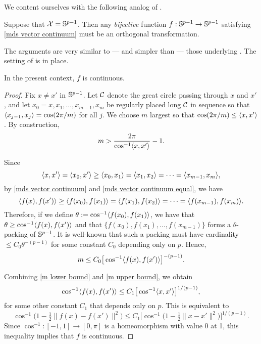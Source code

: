 \documentclass[twoside, 11pt]{article}
\begin{document}
We content ourselves with the following analog of .

\begin{proposition}
\label{prp:shepard_sphere}
Suppose that $\mathcal{X} = \mathbb{S}^{p-1}$. Then any {\em bijective} function $f: \mathbb{S}^{p-1} \to \mathbb{S}^{p-1}$ satisfying \eqref{mds vector continuum} must be an orthogonal transformation. 
\end{proposition}

The arguments are very similar to --- and simpler than --- those underlying . The setting of  is in place. 

\begin{lemma}
\label{lem:f_shepard_vector_continuous}
In the present context, $f$ is continuous.
\end{lemma}

\begin{proof}
Fix $x \ne x'$ in $\mathbb{S}^{p-1}$. Let $\mathcal{C}$ denote the great circle passing through $x$ and $x'$, and let $x_0 = x, x_1, \dots, x_{m-1}, x_m$ be regularly placed long $\mathcal{C}$ in sequence so that $\langle x_{j-1}, x_j\rangle = \cos (2\pi/m)$ for all $j$. We choose $m$ largest so that $\cos (2\pi/m) \le \langle x,x'\rangle$. By construction,
\begin{equation} \label{m lower bound}
m > \frac{2\pi}{\cos^{-1} \langle x,x'\rangle} - 1. 
\end{equation}

Since 
\[\langle x,x'\rangle = \langle x_0, x'\rangle
 \ge \langle x_0, x_1\rangle = \langle x_1,x_2\rangle = \cdots = \langle x_{m-1},x_m\rangle,\]
by \eqref{mds vector continuum} and \eqref{mds vector continuum equal}, we have 
\[\langle f(x),f(x')\rangle \ge \langle f(x_0), f(x_1)\rangle = \langle f(x_1),f(x_2)\rangle = \cdots = \langle f(x_{m-1}),f(x_m)\rangle.\]
Therefore, if we define $\theta := \cos^{-1} \langle f(x_0), f(x_1)\rangle$, we have that $\theta \ge \cos^{-1} \langle f(x),f(x')\rangle$ and that $\{f(x_0), f(x_1), \dots, f(x_{m-1})\}$ forms a $\theta$-packing of $\mathbb{S}^{p-1}$. It is well-known that such a packing must have cardinality $\le C_0 \theta^{-(p-1)}$ for some constant $C_0$ depending only on $p$. Hence,
\begin{equation} \label{m upper bound}
m \le C_0 \big[\cos^{-1} \langle f(x),f(x')\rangle\big]^{-(p-1)}. 
\end{equation}

Combining \eqref{m lower bound} and \eqref{m upper bound}, we obtain
\[\cos^{-1} \langle f(x),f(x')\rangle \le C_1 \big[\cos^{-1} \langle x,x'\rangle\big]^{1/(p-1)},\]
for some other constant $C_1$ that depends only on $p$. 
This is equivalent to
\[\cos^{-1} \big(1 - \tfrac12 \|f(x)-f(x')\|^2\big) \le C_1 \big[\cos^{-1} \big(1 - \tfrac12 \|x-x'\|^2\big)\big]^{1/(p-1)}.\]
Since $\cos^{-1} : [-1,1] \to [0, \pi]$ is a homeomorphism with value $0$ at 1, this inequality implies that $f$ is continuous.
\end{proof}
\end{document}
